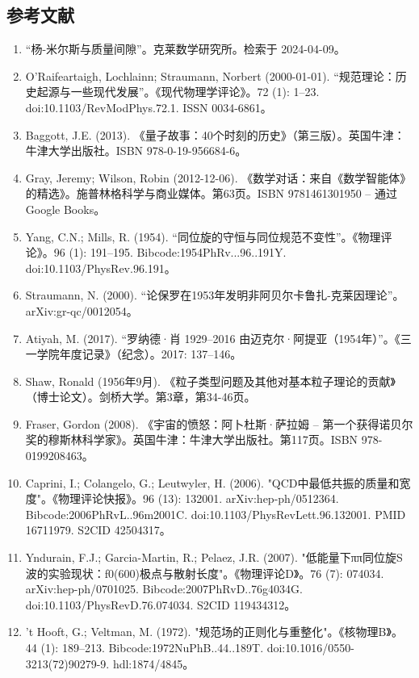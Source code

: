 \subsection{参考文献}
\begin{enumerate}
\item “杨-米尔斯与质量间隙”。克莱数学研究所。检索于 2024-04-09。
\item O’Raifeartaigh, Lochlainn; Straumann, Norbert (2000-01-01). “规范理论：历史起源与一些现代发展”。《现代物理学评论》。72 (1): 1–23. doi:10.1103/RevModPhys.72.1. ISSN 0034-6861。
\item Baggott, J.E. (2013). 《量子故事：40个时刻的历史》（第三版）。英国牛津：牛津大学出版社。ISBN 978-0-19-956684-6。
\item  Gray, Jeremy; Wilson, Robin (2012-12-06). 《数学对话：来自《数学智能体》的精选》。施普林格科学与商业媒体。第63页。ISBN 9781461301950 – 通过Google Books。
\item Yang, C.N.; Mills, R. (1954). “同位旋的守恒与同位规范不变性”。《物理评论》。96 (1): 191–195. Bibcode:1954PhRv...96..191Y. doi:10.1103/PhysRev.96.191。
\item Straumann, N. (2000). “论保罗在1953年发明非阿贝尔卡鲁扎-克莱因理论”。arXiv:gr-qc/0012054。
\item Atiyah, M. (2017). “罗纳德·肖 1929–2016 由迈克尔·阿提亚（1954年）”。《三一学院年度记录》（纪念）。2017: 137–146。
\item Shaw, Ronald (1956年9月). 《粒子类型问题及其他对基本粒子理论的贡献》（博士论文）。剑桥大学。第3章，第34-46页。
\item Fraser, Gordon (2008). 《宇宙的愤怒：阿卜杜斯·萨拉姆 – 第一个获得诺贝尔奖的穆斯林科学家》。英国牛津：牛津大学出版社。第117页。ISBN 978-0199208463。
\item Caprini, I.; Colangelo, G.; Leutwyler, H. (2006). "QCD中最低共振的质量和宽度"。《物理评论快报》。96 (13): 132001. arXiv:hep-ph/0512364. Bibcode:2006PhRvL..96m2001C. doi:10.1103/PhysRevLett.96.132001. PMID 16711979. S2CID 42504317。 
\item Yndurain, F.J.; Garcia-Martin, R.; Pelaez, J.R. (2007). "低能量下ππ同位旋S波的实验现状：f0(600)极点与散射长度"。《物理评论D》。76 (7): 074034. arXiv:hep-ph/0701025. Bibcode:2007PhRvD..76g4034G. doi:10.1103/PhysRevD.76.074034. S2CID 119434312。
\item 't Hooft, G.; Veltman, M. (1972). "规范场的正则化与重整化"。《核物理B》。44 (1): 189–213. Bibcode:1972NuPhB..44..189T. doi:10.1016/0550-3213(72)90279-9. hdl:1874/4845。
\end{enumerate}
